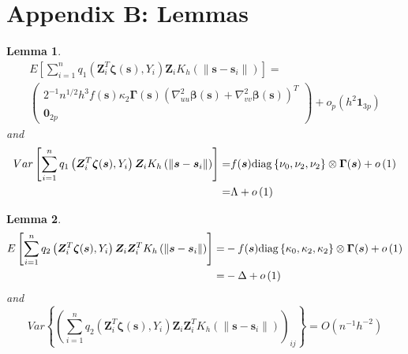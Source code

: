 \documentclass[authoryear,review, 12pt]{elsarticle}
\newtheorem{lem}{Lemma}
\begin{document}
\section*{Appendix B: Lemmas}
\begin{lem}
\label{lemma:omega}
\begin{multline*}
E\left[\sum_{i=1}^{n}q_{1}\left(\bm{Z}_{i}^{T}\bm{\zeta}(\bm{s}),Y_{i}\right)\bm{Z}_{i}K_{h}\left(\|\bm{s}-\bm{s}_{i}\|\right)\right]=\\
\left(\begin{array}{c}
2^{-1}n^{1/2}h^{3}f(\bm{s})\kappa_{2}\bm{\Gamma}(\bm{s})\left(\nabla_{uu}^{2}\bm{\beta}(\bm{s})+\nabla_{vv}^{2}\bm{\beta}(\bm{s})\right)^{T}\\
\bm{0}_{2p}
\end{array}\right)+o_{p}\left(h^{2}\bm{1}_{3p}\right)
\end{multline*}
and
\begin{align*}
Var\left[\sum_{i=1}^{n}q_{1}\left(\bm{Z}_{i}^{T}\bm{\zeta}(\bm{s}),Y_{i}\right)\bm{Z}_{i}K_{h}\left(\|\bm{s}-\bm{s}_{i}\|\right)\right]= & f(\bm{s}){\rm diag}\left\{ \nu_{0},\nu_{2},\nu_{2}\right\} \otimes\bm{\Gamma}(\bm{s})+o\left(1\right)\\
= & \Lambda+o\left(1\right)
\end{align*}
\end{lem}
\begin{lem}
\label{lemma:delta}
\begin{align*}
E\left[\sum_{i=1}^{n}q_{2}\left(\bm{Z}_{i}^{T}\bm{\zeta}(\bm{s}),Y_{i}\right)\bm{Z}_{i}\bm{Z}_{i}^{T}K_{h}\left(\|\bm{s}-\bm{s}_{i}\|\right)\right]= & -f(\bm{s}){\rm diag}\left\{ \kappa_{0},\kappa_{2},\kappa_{2}\right\} \otimes\bm{\Gamma}(\bm{s})+o\left(1\right)\\
= & -\Delta+o\left(1\right)
\end{align*}
and
\[
Var\left\{ \left(\sum_{i=1}^{n}q_{2}\left(\bm{Z}_{i}^{T}\bm{\zeta}(\bm{s}),Y_{i}\right)\bm{Z}_{i}\bm{Z}_{i}^{T}K_{h}\left(\|\bm{s}-\bm{s}_{i}\|\right)\right)_{ij}\right\} =O\left(n^{-1}h^{-2}\right)
\]
\end{lem}
\end{document}
